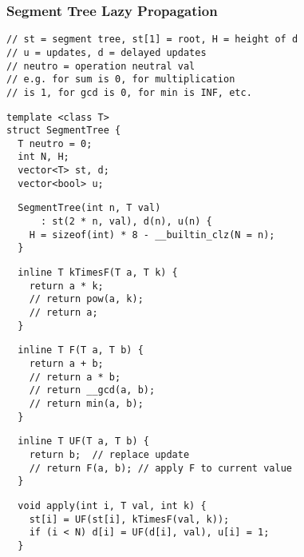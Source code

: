 \documentclass[twoside]{article}
\begin{document}
\begin{multicols*}{2}
\subsubsectionfont{\large\bfseries\sffamily\underline}
\subsubsection*{Segment Tree Lazy Propagation}
\begin{verbatim}
// st = segment tree, st[1] = root, H = height of d
// u = updates, d = delayed updates
// neutro = operation neutral val
// e.g. for sum is 0, for multiplication
// is 1, for gcd is 0, for min is INF, etc.
\end{verbatim}
\vspace{-12pt}
\begin{verbatim}
template <class T>
struct SegmentTree {
  T neutro = 0;
  int N, H;
  vector<T> st, d;
  vector<bool> u;
\end{verbatim}
\vspace{-12pt}
\begin{verbatim}
  SegmentTree(int n, T val)
      : st(2 * n, val), d(n), u(n) {
    H = sizeof(int) * 8 - __builtin_clz(N = n);
  }
\end{verbatim}
\vspace{-12pt}
\begin{verbatim}
  inline T kTimesF(T a, T k) {
    return a * k;
    // return pow(a, k);
    // return a;
  }
  \end{verbatim}
\vspace{-12pt}
\begin{verbatim}
  inline T F(T a, T b) {
    return a + b;
    // return a * b;
    // return __gcd(a, b);
    // return min(a, b);
  }
\end{verbatim}
\vspace{-12pt}
\begin{verbatim}
  inline T UF(T a, T b) {
    return b;  // replace update
    // return F(a, b); // apply F to current value
  }
\end{verbatim}
\vspace{-12pt}
\begin{verbatim}
  void apply(int i, T val, int k) {
    st[i] = UF(st[i], kTimesF(val, k));
    if (i < N) d[i] = UF(d[i], val), u[i] = 1;
  }
\end{verbatim}
\vspace{-12pt}

\end{multicols*}
\end{document}
